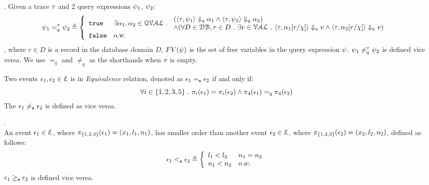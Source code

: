 %
\begin{defn}.
%
\label{def:query_equal}
Given a trace $\mathtt{\tau}$ and 2 query expressions $\psi_1$, $\psi_2$:
$$
\qexpr_1 =_{q}^{\trace} \qexpr_2 \triangleq
\left\{
  \begin{array}{ll} 
    \etrue      
    & 
  \exists \qval_1, \qval_2 \in \mathcal{QVAL} \st
  \begin{array}{l} 
    (\config{\trace,  \qexpr_1} \qarrow \qval_1 \land \config{\trace,  \qexpr_2 } \qarrow \qval_2) 
    \\
    \land (\forall D \in \dbdom, r \in D \st 
    \exists v \in \mathcal{VAL} \st 
          \config{\trace, \qval_1[r/\chi]} \aarrow v \land \config{\trace,  \qval_2[r/\chi] } \aarrow v)  
  \end{array}\\
    \efalse         
    & \text{o.w.} 
  \end{array}
  \right.
$$
%
, where $r \in D$ is a record in the database domain $D$, $FV(\psi)$ is the set of free variables in the query expression $\psi$.
$\psi_1 \neq_{q}^{\mathtt{\tau}} \psi_2$  is defined vice versa.
%
We use $=_{q}$  and $\neq_{q}$ as the shorthands when $\mathtt{\tau}$ is empty.
\end{defn}
%
\begin{defn}
Two events $\mathtt{\epsilon}_1, \mathtt{\epsilon}_2 \in \mathcal{E}$ is in \emph{Equivalence} relation, denoted as $\mathtt{\epsilon}_1 =_{\mathtt{e}} \mathtt{\epsilon}_2$ if and only if:
\[
\forall i \in \{1, 2, 3, 5\} ~.~ \pi_{i}(\mathtt{\epsilon}_1) = \pi_{i}(\mathtt{\epsilon}_2) 
\land
\pi_{4}(\mathtt{\epsilon}_1) =_q \pi_{4}(\mathtt{\epsilon}_2)
\]
%
The $\mathtt{\epsilon}_1 \neq_{\mathtt{e}} \mathtt{\epsilon}_2$ is defined as vice versa.
\end{defn}
%
%
%
\begin{defn}.
\label{def:query_dir}
\\
An event $\mathtt{\epsilon}_1 \in \mathcal{E}$, where $\pi_{\{1, 2, 3\}}(\mathtt{\epsilon}_1) = (x_1, l_1, n_1)$,
has smaller order than another event $\mathtt{\epsilon}_2 \in \mathcal{E}$, 
where 
$ \pi_{\{1, 2, 3\}}(\mathtt{\epsilon}_2) = (x_2, l_2, n_2)$, defined as follows:
%
\[
\event_1 \eventlt \event_2
\triangleq 
\left\{
\begin{array}{ll}
  l_1 < l_2 & n_1 = n_2
  \\
  n_1 < n_2  & o.w.
\end{array}  
\right.
\]
%
$\mathtt{\epsilon}_1 \geq_{\mathtt{e}} \mathtt{\epsilon}_2$  is defined vice versa.
\end{defn}
%
%